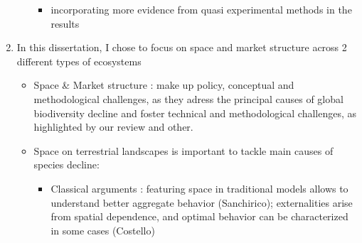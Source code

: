 \begin{enumerate}
\begin{itemize}
\begin{itemize}
\item incorporating more evidence from quasi experimental methods in the results
\end{itemize}
\end{itemize}
\item In this dissertation, I chose to focus on space and market structure across 2 different types of ecosystems
\begin{itemize}
\item Space \& Market structure : make up policy, conceptual and methodological challenges, as they adress the principal causes of global biodiversity decline and foster technical and methodological challenges, as highlighted by our review and other. 
\item Space on terrestrial landscapes is important to tackle main causes of species decline: 
\begin{itemize}
\item Classical arguments : featuring space in traditional models allows to understand better aggregate behavior (Sanchirico); externalities arise from spatial dependence, and optimal behavior can be characterized in some cases (Costello)


\end{itemize}
\end{itemize}
\end{enumerate}
